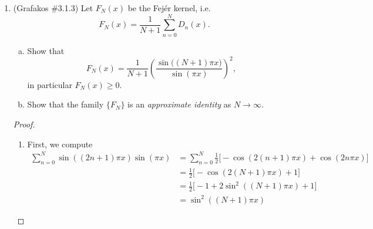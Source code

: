 \documentclass[a4paper]{article}
\begin{document}
\begin{enumerate}
\begin{proof}
\begin{enumerate}
      Combining these two, we have
      \begin{align*}
        \| D_N \|_{L^1} &= 2 \int_{0}^{\frac{1}{2N+1}} \left| \frac{\sin\left( (2N+1) \pi x \right)}{\sin( \pi x )} \right| dx + 2 \sum_{k=1}^{N}
        \int_{\frac{k}{2N+1}}^{\frac{k+1}{2N+1}} \left| \frac{\sin\left( (2N+1)\pi x \right)}{\sin(\pi x)} \right| dx \\
        &\leq 2 + \sum_{k=1}^N \frac{2}{\pi k} \\
        &\leq 2 + \frac{2}{\pi} \log N
      \end{align*}

      Thus there exist constants $c,C$ such that
      \[ c \log N \leq \|D_N\|_{L^1} \leq C \log N .\]

  \end{enumerate}

\end{proof}

\item (Grafakos \#3.1.3) Let $F_N (x)$ be the Fej\'{e}r  kernel, i.e. $$ F_N (x) = \frac1{N+1} \sum_{n=0}^N D_n (x). $$

\begin{enumerate}[(a)]
\item Show that $$ F_N (x)  = \frac{1}{N+1} \left( \frac{\sin \big( (N+1) \pi x\big)}{ \sin (\pi x)} \right)^2 , $$ in particular $F_N (x) \ge 0$.
\item Show that the family $\{ F_N \}$ is an {\it{approximate identity}} as $N\rightarrow \infty$.

\end{enumerate}

\begin{proof}
  \begin{enumerate}
    \item
      First, we compute
      \begin{align}
        \sum_{n=0}^N \sin \left( (2n+1) \pi x \right) \sin ( \pi x ) &= \sum_{n=0}^N \frac{1}{2} \big[ - \cos \left( 2 (n+1) \pi x \right) + \cos
        \left( 2 n \pi x \right) \big] \nonumber \\ %
        &= \frac{1}{2} \big[ - \cos \left( 2(N+1) \pi x \right) + 1 \big] \nonumber \\ %
        &= \frac{1}{2} \big[ - 1 + 2 \sin^2 \left( (N+1) \pi x \right) + 1 \big] \nonumber \\ %
        &= \sin^2 \left( (N+1) \pi x \right)
        \label{eqn:trig_prod}
      \end{align}


\end{enumerate}
\end{proof}
\end{enumerate}
\end{document}

